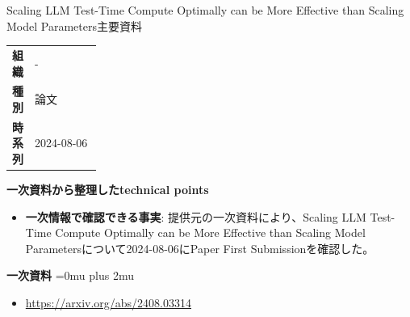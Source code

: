 \begin{technicalnote}{Scaling LLM Test-Time Compute Optimally can be More Effective than Scaling Model Parameters}{主要資料}
\begingroup
\begin{tabularx}{\linewidth}{@{}>{\bfseries}p{0.22\linewidth}X@{}}
組織 & - \\
種別 & 論文 \\
時系列 & 2024-08-06 \\
\end{tabularx}
\smallskip
{\bfseries 一次資料から整理したtechnical points}
\begin{itemize}[leftmargin=1.5em,itemsep=0.35em]
\item \textbf{一次情報で確認できる事実}: 提供元の一次資料により、Scaling LLM Test-Time Compute Optimally can be More Effective than Scaling Model Parametersについて2024-08-06にPaper First Submissionを確認した。
\end{itemize}
\begin{minipage}{\linewidth}
\begin{samepage}
{\bfseries 一次資料}
\begingroup\sloppy
\Urlmuskip=0mu plus 2mu\relax
\begin{itemize}[leftmargin=1.5em,itemsep=0.25em]
\item {\scriptsize\url{https://arxiv.org/abs/2408.03314}}
\end{itemize}
\endgroup
\end{samepage}
\end{minipage}
\endgroup
\end{technicalnote}
\medskip

